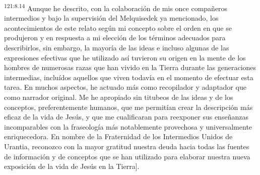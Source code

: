 \par
\textsuperscript{121:8.14} Aunque he descrito, con la colaboración de mis once compañeros intermedios y bajo la supervisión del Melquisedek ya mencionado, los acontecimientos de este relato según mi concepto sobre el orden en que se produjeron y en respuesta a mi elección de los términos adecuados para describirlos, sin embargo, la mayoría de las ideas e incluso algunas de las expresiones efectivas que he utilizado así tuvieron su origen en la mente de los hombres de numerosas razas que han vivido en la Tierra durante las generaciones intermedias, incluídos aquellos que viven todavía en el momento de efectuar esta tarea. En muchos aspectos, he actuado más como recopilador y adaptador que como narrador original. Me he apropiado sin titubeos de las ideas y de los conceptos, preferentemente humanos, que me permitían crear la descripción más eficaz de la vida de Jesús, y que me cualificaran para reexponer sus enseñanzas incomparables con la fraseología más notablemente provechosa y universalmente enriquecedora. En nombre de la Fraternidad de los Intermedios Unidos de Urantia, reconozco con la mayor gratitud nuestra deuda hacia todas las fuentes de información y de conceptos que se han utilizado para elaborar nuestra nueva exposición de la vida de Jesús en la Tierra].